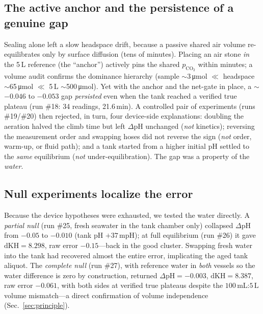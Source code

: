 \documentclass[11pt]{article}
\newcommand{\dpH}{\ensuremath{\Delta\mathrm{pH}}}
\newcommand{\pco}{\ensuremath{p_{\mathrm{CO_2}}}}
\begin{document}
\subsection{The active anchor and the persistence of a genuine gap}
Sealing alone left a slow headspace drift, because a passive shared air volume
re-equilibrates only by surface diffusion (tens of minutes). Placing an air
stone \emph{in} the 5\,L reference (the ``anchor'') actively pins the shared
\pco{} within minutes; a volume audit confirms the dominance hierarchy
(sample $\sim$3\,\si{\micro mol} $\ll$ headspace $\sim$65\,\si{\micro mol}
$\ll$ 5\,L $\sim$500\,\si{\micro mol}). Yet with the anchor and the net-gate
in place, a $\sim$$-0.046$ to $-0.053$ gap \emph{persisted} even when the tank
reached a verified true plateau (run \#18: 34 readings, 21.6\,min). A
controlled pair of experiments (runs \#19/\#20) then rejected, in turn, four
device-side explanations: doubling the aeration halved the climb time but left
\dpH{} unchanged (\emph{not} kinetics); reversing the measurement order and
swapping hoses did not reverse the sign (\emph{not} order, warm-up, or fluid
path); and a tank started from a higher initial pH settled to the \emph{same}
equilibrium (\emph{not} under-equilibration). The gap was a property of the
\emph{water}.

\subsection{Null experiments localize the error}
Because the device hypotheses were exhausted, we tested the water directly.
A \emph{partial null} (run \#25, fresh seawater in the tank chamber only)
collapsed \dpH{} from $-0.05$ to $-0.010$ (tank pH $+37$\,mpH); at full
equilibrium (run \#26) it gave $\mathrm{dKH}=8.298$, raw error $-0.15$---back in
the good cluster. Swapping fresh water into the tank had recovered almost the
entire error, implicating the aged tank aliquot. The \emph{complete null}
(run \#27), with reference water in \emph{both} vessels so the water difference
is zero by construction, returned $\dpH=-0.003$, $\mathrm{dKH}=8.387$, raw error
$\mathbf{-0.061}$, with both sides at verified true plateaus despite the
$100\,\mathrm{mL}$:$5\,\mathrm{L}$ volume mismatch---a direct confirmation of
volume independence (Sec.~\ref{sec:principle}).
\end{document}

